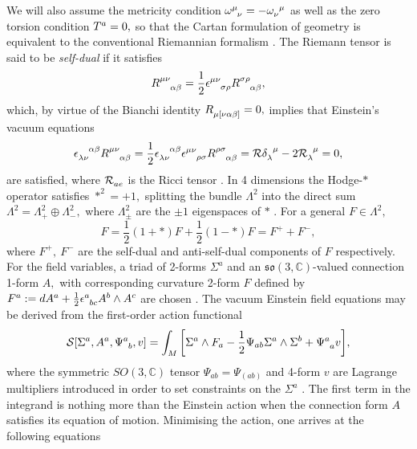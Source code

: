 \documentclass[a4paper,12pt, onecolumn, notitlepage]{article}
\theoremstyle{definition}
\theoremstyle{remark}
\newcommand{\al}{\alpha}
\newcommand{\w}{\omega}
\newcommand{\m}{\mu}
\newcommand{\n}{\nu}
\newcommand{\e}{\epsilon}
\begin{document}
We will also assume the metricity condition $\w\indices{^\m_\n}=-\w\indices{_\n^\m}$ as well as the zero torsion condition $T\indices{^a}=0,$ so that the Cartan formulation of geometry is equivalent to the conventional Riemannian formalism \cite{eguchi_1980}. The Riemann tensor is said to be \emph{self-dual} if it satisfies
\begin{equation*}
	R\indices{^\m^\n_\al_\beta} = \frac{1}{2}\e\indices{^\m^\n_\sigma_\rho}R\indices{^\sigma^\rho_\al_\beta},
\end{equation*}
which, by virtue of the Bianchi identity $R\indices{_\m_{[\n\al\beta]}}=0,$ implies that Einstein's vacuum equations
\begin{equation*}
	\e\indices{_{\lambda\n}^{\al\beta}}R\indices{^{\m\n}_{\al\beta}}=\frac{1}{2}\e\indices{_{\lambda\n}^{\al\beta}}\e\indices{^{\m\n}_{\rho\sigma}}R\indices{^{\rho\sigma}_{\al\beta}}= \mathcal{R}\delta\indices{_{\lambda}^\m}-2\mathcal{R}\indices{_\lambda^\m}=0,
\end{equation*}
are satisfied, where $\mathcal{R}\indices{_{ae}}$ is the Ricci tensor \cite{eguchi_1980}. In 4 dimensions the Hodge-$\ast$ operator satisfies $\ast^{2}=+1,$ splitting the bundle $\Lambda^{2}$ into the direct sum $\Lambda^{2}=\Lambda^{2}_{+}\oplus\Lambda^{2}_{-},$ where $\Lambda^{2}_{\pm}$ are the $\pm 1$ eigenspaces of $\ast$ \cite{atiyah_1978}. For a general $F\in\Lambda^{2},$
\begin{equation*}
	F = \frac{1}{2}(1+\ast)F + \frac{1}{2}(1-\ast)F = F^{+} + F^{-},
\end{equation*}
where $F^{+},\ F^{-}$ are the self-dual and anti-self-dual components of $F$ respectively.\\
For the field variables, a triad of 2-forms $\Sigma^{a}$ and an $\mathfrak{so}(3,\mathbb{C})$-valued connection 1-form $A,$ with corresponding curvature 2-form $F$ defined by $F\indices{^a}:=dA\indices{^a}+\frac{1}{2}\e\indices{^a_b_c}A\indices{^b}\wedge A\indices{^c}$ are chosen \cite{capovilla_1989}.
The vacuum Einstein field equations may be derived from the first-order action functional
\begin{equation}
\label{action}
\mathcal{S}[\Sigma^{a}, A^{a}, \Psi\indices{^a_b}, v] = \int_{M}\bigg[\Sigma^{a}\wedge F_{a} - \frac{1}{2}\Psi_{ab}\Sigma^{a}\wedge\Sigma^{b} + \Psi\indices{^a_a}v\bigg],
\end{equation}
where the symmetric $SO(3,\mathbb{C})$ tensor $\Psi_{ab}=\Psi_{(ab)}$ and 4-form $v$ are Lagrange multipliers introduced in order to set constraints on the $\Sigma^{a}$ \cite{capovilla_1989}. The first term in the integrand is nothing more than the Einstein action when the connection form $A$ satisfies its equation of motion. Minimising the action, one arrives at the following equations
\end{document}
